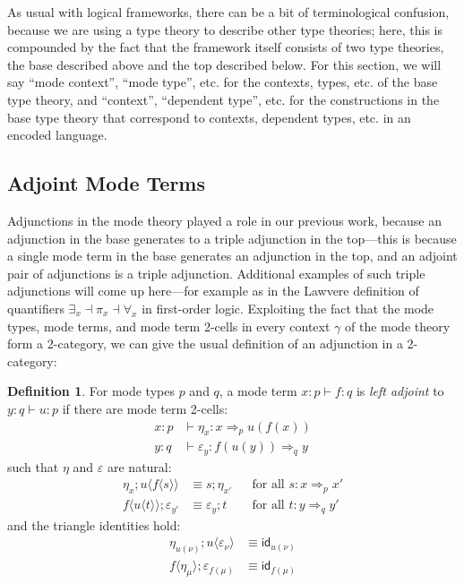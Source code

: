 \documentclass[10pt]{article}
\theoremstyle{definition}
\newtheorem{definition}{Definition}
\newcommand{\yields}{\vdash}
\newcommand{\tcell}{\Rightarrow}
\newcommand{\id}{\mathsf{id}}
\newcommand\ap[2]{\ensuremath{#1 \langle #2 \rangle }}
\begin{document}
As usual with logical frameworks, there can be a bit of terminological
confusion, because we are using a type theory to describe other type
theories; here, this is compounded by the fact that the framework itself
consists of two type theories, the base described above and the top
described below.  For this section, we will say ``mode context'', ``mode
type'', etc. for the contexts, types, etc. of the base type theory, and
``context'', ``dependent type'', etc. for the constructions in the base
type theory that correspond to contexts, dependent types, etc. in an
encoded language.  

\subsection{Adjoint Mode Terms}

Adjunctions in the mode theory played a role in our previous work,
because an adjunction in the base generates to a triple adjunction in
the top---this is because a single mode term in the base generates an
adjunction in the top, and an adjoint pair of adjunctions is a triple
adjunction.  Additional examples of such triple adjunctions will come up
here---for example as in the Lawvere definition of quantifiers
$\exists_x \dashv \pi_x \dashv \forall_x$ in first-order logic.
Exploiting the fact that the mode types, mode terms, and mode term
2-cells in every context $\gamma$ of the mode theory form a 2-category,
we can give the usual definition of an adjunction in a 2-category:

\begin{definition} \label{def:adjunction}
For mode types $p$ and $q$, a mode term $x : p \yields f : q$ is
\emph{left adjoint} to $y : q \yields u : p$ if there are mode term
2-cells:
\begin{align*}
 x : p &\yields \eta_x : x \tcell_p u(f(x)) \\
 y : q &\yields \varepsilon_y : f(u(y)) \tcell_q y
\end{align*}
such that $\eta$ and $\varepsilon$ are natural:
\begin{align}
\eta_x ; \ap{u}{\ap{f}{s}} &\equiv s ; \eta_{x'} && \text{for all } s : x \tcell_p x'  \\
\ap{f}{\ap{u}{t}} ; \varepsilon_{y'}  &\equiv \varepsilon_y ; t && \text{for all } t : y \tcell_q y'
\end{align}
and the triangle identities hold:
\begin{align}
\eta_{u(\nu)};\ap{u}{\varepsilon_\nu} &\equiv \id_{u(\nu)} \\
\ap{f}{\eta_\mu};\varepsilon_{f(\mu)} &\equiv \id_{f(\mu)}
\end{align}
\end{definition}
\end{document}
